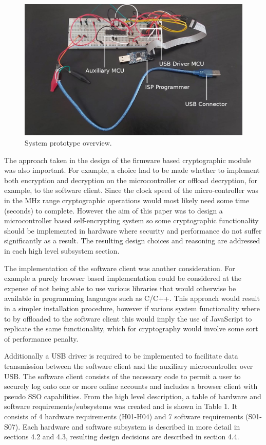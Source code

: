 \begin{figure}[H]
\centering
\includegraphics[width=0.9\columnwidth]{Figures/Fig_76.jpeg}
\caption{System prototype overview.}
\label{fig:gantt}
\end{figure}

The approach taken in the design of the firmware based cryptographic module was also important. For example, a choice had to be made whether to implement both encryption and decryption on the microcontroller or offload decryption, for example, to the software client. Since the clock speed of the micro-controller was in the MHz range cryptographic operations would most likely need some time (seconds) to complete. However the aim of this paper was to design a microcontroller based self-encrypting system so some cryptographic functionality should be implemented in hardware where security and performance do not suffer significantly as a result. The resulting design choices and reasoning are addressed in each high level subsystem section. 

The implementation of the software client was another consideration. For example a purely browser based implementation could be considered at the expense of not being able to use various libraries that would otherwise be available in programming languages such as C/C++. This approach would result in a simpler installation procedure, however if various system functionality where to by offloaded to the software client this would imply the use of JavaScript to replicate the same functionality, which for cryptography would involve some sort of performance penalty.

Additionally a USB driver is required to be implemented to facilitate data transmission between the software client and the auxiliary microcontroller over USB. The software client consists of the necessary code to permit a user to securely log onto one or more online accounts and includes a browser client with pseudo SSO capabilities. From the high level description, a table of hardware and software requirements/subsystems was created and is shown in Table 1. It consists of 4 hardware requirements (H01-H04) and 7 software requirements (S01-S07). Each hardware and software subsystem is described in more detail in sections 4.2 and 4.3, resulting design decisions are described in section 4.4.



